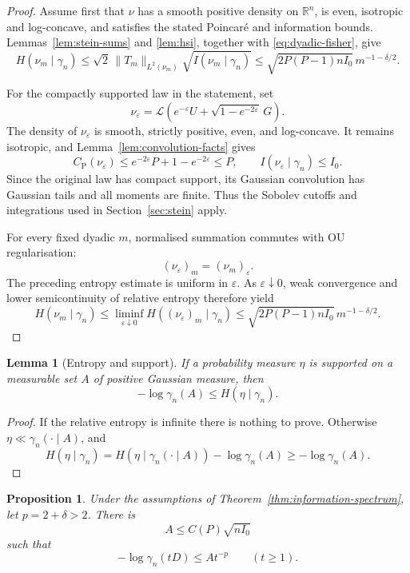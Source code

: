 \documentclass[11pt]{amsart}
\numberwithin{equation}{section}
\newtheorem{proposition}[theorem]{Proposition}
\newtheorem{lemma}[theorem]{Lemma}
\theoremstyle{definition}
\theoremstyle{remark}
\newcommand{\R}{\mathbb R}
\newcommand{\gam}{\gamma_n}
\newcommand{\CP}{C_{\mathrm P}}
\newcommand{\eps}{\varepsilon}
\newcommand{\norm}[1]{\lVert #1\rVert}
\begin{document}
\begin{proof}
Assume first that \(\nu\) has a smooth positive density on \(\R^n\),
is even, isotropic and log-concave, and satisfies the stated Poincar\'e
and information bounds.
Lemmas~\ref{lem:stein-sums} and \ref{lem:hsi}, together with
\eqref{eq:dyadic-fisher}, give
\[
H(\nu_m\mid\gam)
\le \sqrt2\,\norm{T_m}_{L^2(\nu_m)}
       \sqrt{I(\nu_m\mid\gam)}
\le \sqrt{2P(P-1)n I_0}\,m^{-1-\delta/2}.
\]

For the compactly supported law in the statement, set
\[
\nu_\eps
=\mathcal L(e^{-\eps}U+\sqrt{1-e^{-2\eps}}\,G).
\]
The density of \(\nu_\eps\) is smooth, strictly positive, even, and
log-concave. It remains isotropic, and
Lemma~\ref{lem:convolution-facts} gives
\[
\CP(\nu_\eps)\le e^{-2\eps}P+1-e^{-2\eps}\le P,
\qquad
I(\nu_\eps\mid\gam)\le I_0.
\]
Since the original law has compact support, its Gaussian convolution
has Gaussian tails and all moments are finite. Thus the Sobolev
cutoffs and integrations used in Section~\ref{sec:stein} apply.

For every fixed dyadic \(m\), normalised summation commutes with OU
regularisation:
\[
(\nu_\eps)_m=(\nu_m)_\eps.
\]
The preceding entropy estimate is uniform in \(\eps\).
As \(\eps\downarrow0\), weak convergence and lower semicontinuity of
relative entropy therefore yield
\[
H(\nu_m\mid\gam)
\le\liminf_{\eps\downarrow0}H((\nu_\eps)_m\mid\gam)
\le\sqrt{2P(P-1)n I_0}\,m^{-1-\delta/2}.
\]
\end{proof}

\begin{lemma}[Entropy and support]\label{lem:support-entropy}
If a probability measure \(\eta\) is supported on a measurable set \(A\)
of positive Gaussian measure, then
\[
-\log\gam(A)\le H(\eta\mid\gam).
\]
\end{lemma}

\begin{proof}
If the relative entropy is infinite there is nothing to prove.
Otherwise \(\eta\ll\gam(\cdot\mid A)\), and
\[
H(\eta\mid\gam)
=H(\eta\mid\gam(\cdot\mid A))-\log\gam(A)
\ge-\log\gam(A).
\]
\end{proof}

\begin{proposition}\label{prop:gaussian-profile}
Under the assumptions of Theorem~\ref{thm:information-spectrum}, let
\(p=2+\delta>2\). There is
\[
A\le C(P)\sqrt{n I_0}
\]
such that
\begin{equation}\label{eq:gaussian-profile}
-\log\gam(tD)\le A t^{-p}\qquad(t\ge1).
\end{equation}
\end{proposition}
\end{document}
